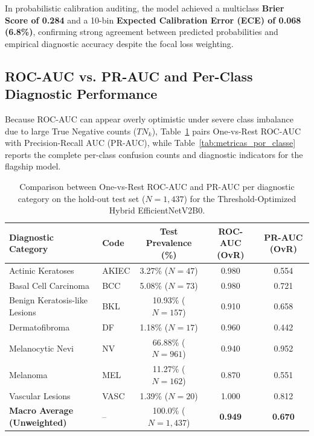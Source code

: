 \documentclass[11pt,a4paper]{article}
\begin{document}
In probabilistic calibration auditing, the model achieved a multiclass \textbf{Brier Score of 0.284} and a 10-bin \textbf{Expected Calibration Error (ECE) of 0.068 (6.8\%)}, confirming strong agreement between predicted probabilities and empirical diagnostic accuracy despite the focal loss weighting.

\subsection{ROC-AUC vs. PR-AUC and Per-Class Diagnostic Performance}
Because ROC-AUC can appear overly optimistic under severe class imbalance due to large True Negative counts ($TN_k$), Table~\ref{tab:auc_detalhado} pairs One-vs-Rest ROC-AUC with Precision-Recall AUC (PR-AUC), while Table~\ref{tab:metricas_por_classe} reports the complete per-class confusion counts and diagnostic indicators for the flagship model.

\begin{table}[htbp]
\centering
\small
\caption{Comparison between One-vs-Rest ROC-AUC and PR-AUC per diagnostic category on the hold-out test set ($N = 1,437$) for the Threshold-Optimized Hybrid EfficientNetV2B0.}
\label{tab:auc_detalhado}
\vspace{0.4em}
\begin{tabularx}{0.92\textwidth}{Xlccc}
\toprule
\textbf{Diagnostic Category} & \textbf{Code} & \textbf{Test Prevalence (\%)} & \textbf{ROC-AUC (OvR)} & \textbf{PR-AUC (OvR)} \\
\midrule
Actinic Keratoses & AKIEC & 3.27\% ($N=47$) & 0.980 & 0.554 \\
Basal Cell Carcinoma & BCC & 5.08\% ($N=73$) & 0.980 & 0.721 \\
Benign Keratosis-like Lesions & BKL & 10.93\% ($N=157$) & 0.910 & 0.658 \\
Dermatofibroma & DF & 1.18\% ($N=17$) & 0.960 & 0.442 \\
Melanocytic Nevi & NV & 66.88\% ($N=961$) & 0.940 & 0.952 \\
Melanoma & MEL & 11.27\% ($N=162$) & 0.870 & 0.551 \\
Vascular Lesions & VASC & 1.39\% ($N=20$) & 1.000 & 0.812 \\
\midrule
\textbf{Macro Average (Unweighted)} & -- & 100.0\% ($N=1,437$) & \textbf{0.949} & \textbf{0.670} \\
\bottomrule
\end{tabularx}
\end{table}
\end{document}
